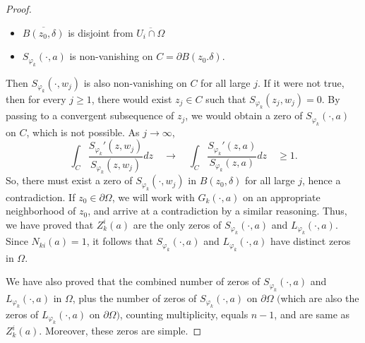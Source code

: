 \documentclass[10pt,a4paper]{amsart}
\newcommand{\Om}{\Omega}
\newcommand{\ov}{\overline}
\begin{document}
\begin{proof}
		\begin{itemize}
			\item[(i)] $\overline{B(z_0,\delta)}$ is disjoint from $\ov{U_i\cap \Om}$
			\item[(ii)] $S_{\varphi_k}(\cdot,a)$ is non-vanishing on $C=\partial B(z_0.\delta)$. 
		\end{itemize}
		
		\noindent Then $S_{\varphi_k}(\cdot,w_j)$ is also non-vanishing on $C$ for all large $j$. If it were not true, then for every $j \ge 1$, there would exist $z_j\in C$ such that $S_{\varphi_k}(z_j,w_j) = 0$. By passing to a convergent subsequence of $z_j$, we would obtain a zero of $S_{\varphi_k}(\cdot,a)$ on $C$, which is not possible. As $j\rightarrow\infty$,
		\[
		\int_{C}\frac{{S_{\varphi_k}}'(z,w_j)}{S_{\varphi_k}(z,w_j)} dz
		\quad
		\rightarrow
		\quad
		\int_{C}\frac{{S_{\varphi_k}}'(z,a)}{S_{\varphi_k}(z,a)} dz
		\quad
		\geq 1.
		\]
		So, there must exist a zero of $S_{\varphi_k}(\cdot,w_j)$ in $B(z_0,\delta)$ for all large $j$, hence a contradiction. If $z_0\in\partial\Om$, we will work with $G_k(\cdot,a)$ on an appropriate neighborhood of $z_0$, and arrive at a contradiction by a similar reasoning. Thus, we have proved that $Z^i_k(a)$ are the only zeros of $S_{\varphi_k}(\cdot,a)$ and $L_{\varphi_k}(\cdot,a)$. Since $N_{ki}(a) = 1$, it follows that $S_{\varphi_k}(\cdot,a)$ and $L_{\varphi_k}(\cdot,a)$ have distinct zeros in $\Om$. 
		
		\medskip
		
		We have also proved that the combined number of zeros of $S_{\varphi_k}(\cdot, a)$ and $L_{\varphi_k}(\cdot,a)$ in $\Om$, plus the number of zeros of  $S_{\varphi_k}(\cdot,a)$ on $\partial\Om$ $($which are also the zeros of $L_{\varphi_k}(\cdot,a)$ on $\partial\Om)$, counting multiplicity, equals $n-1$, and are same as $Z_{k}^i(a)$. Moreover, these zeros are simple.
		
		\medskip
		

\end{proof}
\end{document}
